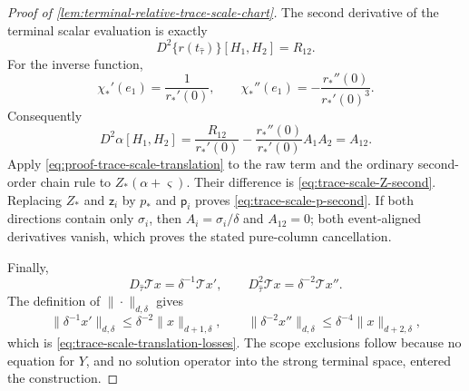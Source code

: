 \begin{proof}[Proof of
\cref{lem:terminal-relative-trace-scale-chart}]
The second derivative of the terminal scalar evaluation is exactly
\[
 D^2\{r(t_{\widehat\tau})\}[H_1,H_2]=R_{12}.
\]
For the inverse function,
\[
 \chi_*'(e_1)=\frac1{r_*'(0)},\qquad
 \chi_*''(e_1)=-\frac{r_*''(0)}{r_*'(0)^3}.
\]
Consequently
\[
 D^2\alpha[H_1,H_2]
 =\frac{R_{12}}{r_*'(0)}
   -\frac{r_*''(0)}{r_*'(0)}A_1A_2
 =A_{12}.
\]
Apply \cref{eq:proof-trace-scale-translation} to the raw term and the
ordinary second-order chain rule to
\(Z_*(\alpha+\varsigma)\).  Their difference is
\cref{eq:trace-scale-Z-second}.  Replacing \(Z_*\) and
\(\mathsf z_i\) by \(p_*\) and \(\mathsf p_i\) proves
\cref{eq:trace-scale-p-second}.  If both directions contain only
\(\sigma_i\), then \(A_i=\sigma_i/\delta\) and \(A_{12}=0\); both
event-aligned derivatives vanish, which proves the stated pure-column
cancellation.

Finally,
\[
 D_{\widehat\tau}\mathcal T x
 =\delta^{-1}\mathcal T x',\qquad
 D_{\widehat\tau}^2\mathcal T x
 =\delta^{-2}\mathcal T x''.
\]
The definition of \(\|\cdot\|_{d,\delta}\) gives
\[
 \|\delta^{-1}x'\|_{d,\delta}
 \le\delta^{-2}\|x\|_{d+1,\delta},\qquad
 \|\delta^{-2}x''\|_{d,\delta}
 \le\delta^{-4}\|x\|_{d+2,\delta},
\]
which is \cref{eq:trace-scale-translation-losses}.  The scope exclusions
follow because no equation for \(Y\), and no solution operator into the
strong terminal space, entered the construction.
\end{proof}

